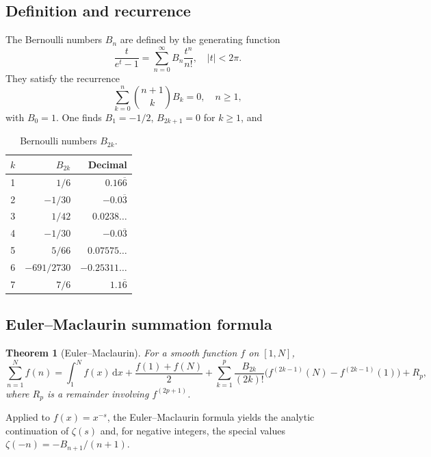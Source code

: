 \documentclass[12pt,a4paper]{amsart}
\newtheorem{theorem}{Theorem}[section]
\theoremstyle{definition}
\theoremstyle{remark}
\begin{document}
\subsection{Definition and recurrence}

The Bernoulli numbers $B_n$ are defined by the generating function
\[
  \frac{t}{e^t - 1} = \sum_{n=0}^{\infty} B_n \frac{t^n}{n!}, \quad |t| < 2\pi.
\]
They satisfy the recurrence
\[
  \sum_{k=0}^{n} \binom{n+1}{k} B_k = 0, \quad n \geq 1,
\]
with $B_0 = 1$. One finds $B_1 = -1/2$, $B_{2k+1} = 0$ for $k \geq 1$, and

\begin{table}[h]
  \centering
  \caption{Bernoulli numbers $B_{2k}$.}
  \vspace{4pt}
  \begin{tabular}{@{}crr@{}}
    \toprule
    $k$ & $B_{2k}$ & Decimal \\
    \midrule
    1 & $1/6$               & $0.16\overline{6}$ \\
    2 & $-1/30$             & $-0.0\overline{3}$ \\
    3 & $1/42$              & $0.0238\ldots$ \\
    4 & $-1/30$             & $-0.0\overline{3}$ \\
    5 & $5/66$              & $0.07575\ldots$ \\
    6 & $-691/2730$         & $-0.25311\ldots$ \\
    7 & $7/6$               & $1.1\overline{6}$ \\
    \bottomrule
  \end{tabular}
\end{table}

\subsection{Euler--Maclaurin summation formula}

\begin{theorem}[Euler--Maclaurin]
  For a smooth function $f$ on $[1, N]$,
  \[
    \sum_{n=1}^{N} f(n) = \int_1^N f(x)\,\mathrm{d}x
    + \frac{f(1) + f(N)}{2}
    + \sum_{k=1}^{p} \frac{B_{2k}}{(2k)!}\bigl(f^{(2k-1)}(N) - f^{(2k-1)}(1)\bigr)
    + R_p,
  \]
  where $R_p$ is a remainder involving $f^{(2p+1)}$.
\end{theorem}

Applied to $f(x) = x^{-s}$, the Euler--Maclaurin formula yields the analytic
continuation of $\zeta(s)$ and, for negative integers, the special values
$\zeta(-n) = -B_{n+1}/(n+1)$.
\end{document}
